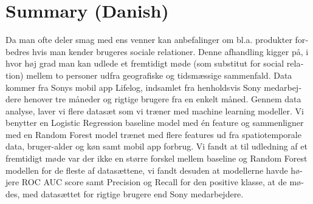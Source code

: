 \chapter{Summary (Danish)}
\begin{otherlanguage}{danish}

Da man ofte deler smag med ens venner kan anbefalinger om bl.a. produkter forbedres hvis man kender brugeres sociale relationer.
Denne afhandling kigger på, i hvor høj grad man kan udlede et fremtidigt møde (som substitut for social relation) mellem to personer udfra geografiske og tidsmæssige sammenfald.
Data kommer fra Sonys mobil app Lifelog, indsamlet fra henholdsvis Sony medarbejdere henover tre måneder og rigtige brugere fra en enkelt måned.
Gennem data analyse, laver vi flere datasæt som vi træner med machine learning modeller.
Vi benytter en Logistic Regression baseline model med én feature og sammenligner med en Random Forest model trænet med flere features ud fra spatiotemporale data, bruger-alder og køn samt mobil app forbrug. Vi fandt at til udledning af et fremtidigt møde var der ikke en større forskel mellem baseline og Random Forest modellen for de fleste af datasættene, vi fandt desuden at modellerne havde højere ROC AUC score samt Precision og Recall for den positive klasse, at de mødes, med datasættet for rigtige brugere end Sony medarbejdere.

\end{otherlanguage}